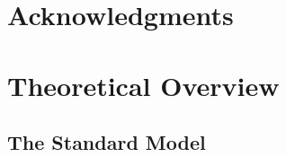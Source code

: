 \documentclass{umassthesis}          %
\begin{document}
\chapter{Acknowledgments}             %
  

\begin{abstract}                %
    
\end{abstract}



\tableofcontents                %
\listoftables                   %
\listoffigures                  %


\mainmatter{}   %

\listoftodos{}

\label{ch:introduction}


% 

\chapter{Theoretical Overview}\label{ch:theory}

\section{The Standard Model}\label{sec:theory_sm}

% 
\end{document}
